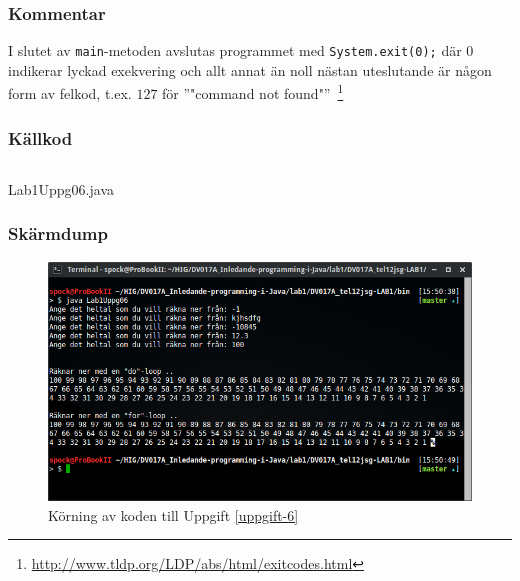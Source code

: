 \subsubsection{Kommentar}
\par I slutet av \texttt{main}-metoden avslutas programmet med
\texttt{System.exit(0);} där $0$ indikerar lyckad exekvering och allt annat än
noll nästan uteslutande är någon form av felkod, t.ex. $127$ för ''"command not found"''\ 
\footnote{\url{http://www.tldp.org/LDP/abs/html/exitcodes.html}}


\subsubsection{Källkod}\label{uppgift-6_src}
    \inputminted[linenos]{java}{src/Lab1Uppg06.java}
    \caption{Lab1Uppg06.java}
    \label{Uppg6src}

\subsubsection{Skärmdump}
\begin{figure}[htbp]
    \centering
        \includegraphics[width=\linewidth]{img/06.png}
    \caption{Körning av koden till Uppgift \ref{uppgift-6}}
    \label{fig:screenshot-06}
\end{figure}
